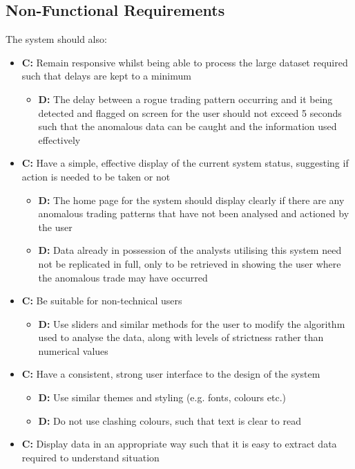 \documentclass[11pt, oneside, a4paper]{article}
\begin{document}
\subsection{Non-Functional Requirements}
The system should also:
\begin{itemize}
	\item \textbf{C:} Remain responsive whilst being able to process the large dataset required such that delays are kept to a minimum
	\begin{itemize}
		\item \textbf{D:} The delay between a rogue trading pattern occurring and it being detected and flagged on screen for the user should not exceed 5 seconds such that the anomalous data can be caught and the information used effectively
	\end{itemize}
	\item \textbf{C:} Have a simple, effective display of the current system status, suggesting if action is needed to be taken or not
	\begin{itemize}
		\item \textbf{D:} The home page for the system should display clearly if there are any anomalous trading patterns that have not been analysed and actioned by the user
		\item \textbf{D:} Data already in possession of the analysts utilising this system need not be replicated in full, only to be retrieved in showing the user where the anomalous trade may have occurred
	\end{itemize}
	\item \textbf{C:} Be suitable for non-technical users
	\begin{itemize}
		\item \textbf{D:} Use sliders and similar methods for the user to modify the algorithm used to analyse the data, along with levels of strictness rather than numerical values
	\end{itemize}
	\item \textbf{C:} Have a consistent, strong user interface to the design of the system
	\begin{itemize}
		\item \textbf{D:} Use similar themes and styling (e.g. fonts, colours etc.)
		\item \textbf{D:} Do not use clashing colours, such that text is clear to read
	\end{itemize}
	\item \textbf{C:} Display data in an appropriate way such that it is easy to extract data required to understand situation

\end{itemize}
\end{document}
